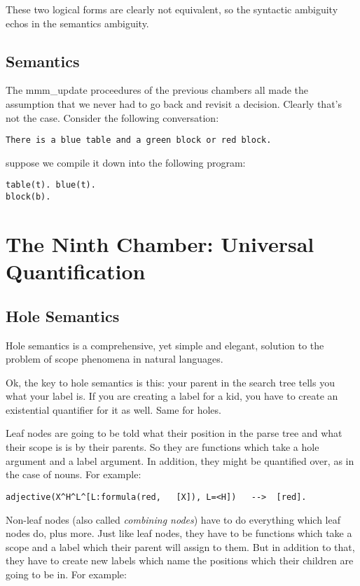 \documentclass{book}[9pt]
\begin{document}
These two logical forms are clearly not equivalent, so the syntactic
ambiguity echos in the semantics ambiguity.  

\section{Semantics}

The mmm\_update proceedures of the previous chambers all 
made the assumption that we never had to go back and
revisit a decision.  Clearly that's not the case. 
Consider the following conversation:
\begin{verbatim}
There is a blue table and a green block or red block.
\end{verbatim}
\noindent suppose we compile it down into the following program:
\begin{verbatim}
table(t). blue(t).
block(b).  
\end{verbatim}


\chapter{The Ninth Chamber: Universal Quantification}


\section{Hole Semantics}

Hole semantics is a comprehensive, yet simple and elegant, solution to
the problem of scope phenomena in natural languages.

Ok, the key to hole semantics is this: your parent in the search tree
tells you what your label is.  If you are creating a label for a kid,
you have to create an existential quantifier for it as well.  Same for
holes.

Leaf nodes are going to be told what their position in the parse tree
and what their scope is is by their parents.  So they are functions
which take a hole argument and a label argument.  In addition, they
might be quantified over, as in the case of nouns.  For example:

\begin{verbatim}
adjective(X^H^L^[L:formula(red,   [X]), L=<H])   -->  [red].
\end{verbatim}

Non-leaf nodes (also called {\em combining nodes}) have to do
everything which leaf nodes do, plus more.  Just like leaf nodes, they
have to be functions which take a scope and a label which their parent
will assign to them.  But in addition to that, they have to create new
labels which name the positions which their children are going to be
in.  For example:
\end{document}
